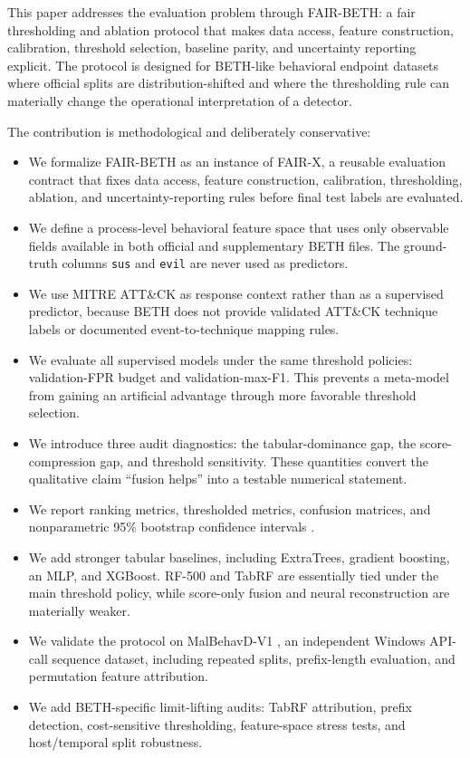 \documentclass[journal]{IEEEtran}
\begin{document}
This paper addresses the evaluation problem through FAIR-BETH: a fair thresholding and ablation protocol that makes data access, feature construction, calibration, threshold selection, baseline parity, and uncertainty reporting explicit. The protocol is designed for BETH-like behavioral endpoint datasets where official splits are distribution-shifted and where the thresholding rule can materially change the operational interpretation of a detector.

The contribution is methodological and deliberately conservative:
\begin{itemize}
    \item We formalize FAIR-BETH as an instance of FAIR-X, a reusable evaluation contract that fixes data access, feature construction, calibration, thresholding, ablation, and uncertainty-reporting rules before final test labels are evaluated.
    \item We define a process-level behavioral feature space that uses only observable fields available in both official and supplementary BETH files. The ground-truth columns \texttt{sus} and \texttt{evil} are never used as predictors.
    \item We use MITRE ATT\&CK as response context rather than as a supervised predictor, because BETH does not provide validated ATT\&CK technique labels or documented event-to-technique mapping rules.
    \item We evaluate all supervised models under the same threshold policies: validation-FPR budget and validation-max-F1. This prevents a meta-model from gaining an artificial advantage through more favorable threshold selection.
    \item We introduce three audit diagnostics: the tabular-dominance gap, the score-compression gap, and threshold sensitivity. These quantities convert the qualitative claim ``fusion helps'' into a testable numerical statement.
    \item We report ranking metrics, thresholded metrics, confusion matrices, and nonparametric 95\% bootstrap confidence intervals \cite{efron1994}.
    \item We add stronger tabular baselines, including ExtraTrees, gradient boosting, an MLP, and XGBoost. RF-500 and TabRF are essentially tied under the main threshold policy, while score-only fusion and neural reconstruction are materially weaker.
    \item We validate the protocol on MalBehavD-V1 \cite{maniriho2023,malbehavd2023}, an independent Windows API-call sequence dataset, including repeated splits, prefix-length evaluation, and permutation feature attribution.
    \item We add BETH-specific limit-lifting audits: TabRF attribution, prefix detection, cost-sensitive thresholding, feature-space stress tests, and host/temporal split robustness.
\end{itemize}
\end{document}
